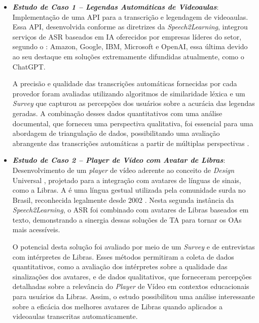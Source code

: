 \begin{itemize}
\item \textbf{\textit{Estudo de Caso 1 -- Legendas Automáticas de Videoaulas}}: Implementação de uma API para a transcrição e legendagem de videoaulas. Essa API, desenvolvida conforme as diretrizes da \textit{Speech2Learning}, integrou serviços de ASR baseados em IA oferecidos por empresas líderes do setor, segundo o : Amazon, Google, IBM, Microsoft e OpenAI, essa última devido ao seu destaque em soluções extremamente difundidas atualmente, como o ChatGPT. 

A precisão e qualidade das transcrições automáticas fornecidas por cada provedor foram avaliadas utilizando algoritmos de similaridade léxica e um \textit{Survey} que capturou as percepções dos usuários sobre a acurácia das legendas geradas. A combinação desses dados quantitativos com uma análise documental, que forneceu uma perspectiva qualitativa, foi essencial para uma abordagem de triangulação de dados, possibilitando uma avaliação abrangente das transcrições automáticas a partir de múltiplas perspectivas \cite{FalvoJr2023_HICSS, FalvoJr2024_FIE}.

\item \textbf{\textit{Estudo de Caso 2 -- Player de Vídeo com Avatar de Libras}}: Desenvolvimento de um \textit{player} de vídeo aderente ao conceito de \textit{Design} Universal \cite{GovBr2023}, projetado para a integração com avatares de línguas de sinais, como a Libras. A  é uma língua gestual utilizada pela comunidade surda no Brasil, reconhecida legalmente desde 2002 \cite{Quadros2017, Quadros2019, Honora2021}. Nesta segunda instância da \textit{Speech2Learning}, o ASR foi combinado com avatares de Libras baseados em texto, demonstrando a sinergia dessas soluções de TA para tornar os OAs mais acessíveis. 

O potencial desta solução foi avaliado por meio de um \textit{Survey} e de entrevistas com intérpretes de Libras. Esses métodos permitiram a coleta de dados quantitativos, como a avaliação dos intérpretes sobre a qualidade das sinalizações dos avatares, e de dados qualitativos, que forneceram percepções detalhadas sobre a relevância do \textit{Player} de Vídeo em contextos educacionais para usuários da Libras. Assim, o estudo possibilitou uma análise interessante sobre a eficácia dos melhores avatares de Libras quando aplicados a videoaulas transcritas automaticamente.
\end{itemize}

